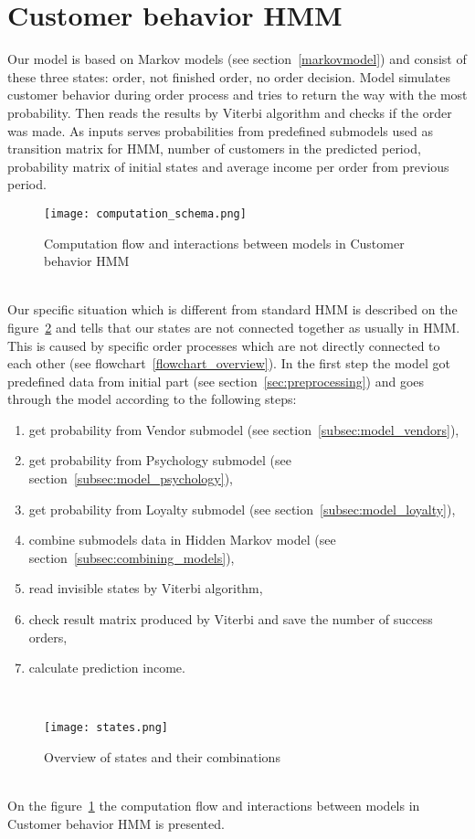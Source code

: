 \section{Customer behavior HMM} \label{sec:submodels}
Our model is based on Markov models (see section~\ref{markovmodel}) and consist of these three states: order, not finished order, no order decision.
Model simulates customer behavior during order process and tries to return the way with the most probability.
Then reads the results by Viterbi algorithm and checks if the order was made.
As inputs serves probabilities from predefined submodels used as transition matrix for HMM, number of customers in the predicted period,
probability matrix of initial states and average income per order from previous period.\\
\begin{figure}[h!]
    \begin{center}
        \texttt{[image: computation\_schema.png]}
    \end{center}
    \caption{Computation flow and interactions between models in Customer behavior HMM}
    \label{Model schema with interaction}
\end{figure}\\
Our specific situation which is different from standard HMM is described on the figure~\ref{states} and tells that our states are not connected together as usually in HMM.
This is caused by specific order processes which are not directly connected to each other (see flowchart~\ref{flowchart_overview}).
In the first step the model got predefined data from initial part (see section~\ref{sec:preprocessing}) and goes through the model according to the following steps:
\begin{enumerate}
    \item get probability from Vendor submodel (see section~\ref{subsec:model_vendors}),
    \item get probability from Psychology submodel (see section~\ref{subsec:model_psychology}),
    \item get probability from Loyalty submodel (see section~\ref{subsec:model_loyalty}),
    \item combine submodels data in Hidden Markov model (see section~\ref{subsec:combining_models}),
    \item read invisible states by Viterbi algorithm,
    \item check result matrix produced by Viterbi and save the number of success orders,
    \item calculate prediction income.
\end{enumerate}\\
\begin{figure}[h!]
    \begin{center}
        \texttt{[image: states.png]}
    \end{center}
    \caption{Overview of states and their combinations}
    \label{states}
\end{figure}\\
On the figure~\ref{Model schema with interaction} the computation flow and interactions between models in Customer behavior HMM is presented.\\

